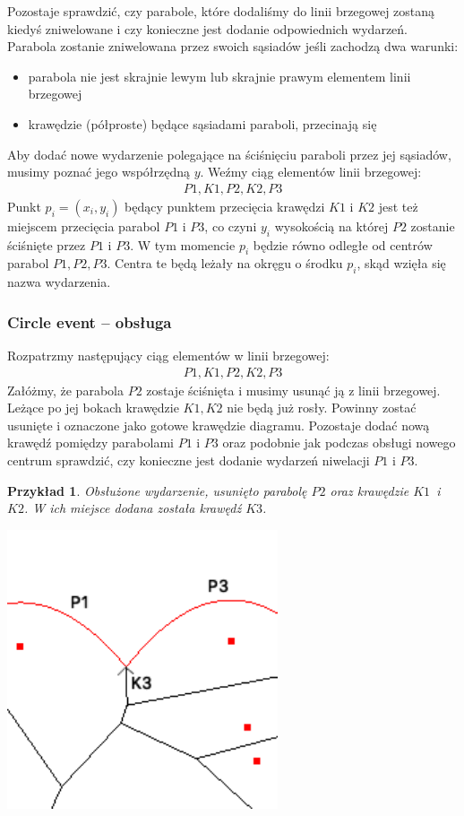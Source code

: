 \documentclass[declaration,shortabstract, inz]{iithesis}
\theoremstyle{definition} \newtheorem{definition}{Definicja}[]
\theoremstyle{plain} \newtheorem{remark}[definition]{Obserwacja}
\theoremstyle{plain} \newtheorem{theorem}[definition]{Twierdzenie}
\theoremstyle{plain} \newtheorem{example}{Przykład}[definition]
\theoremstyle{plain} \newtheorem{lemma}[definition]{Lemat}
\begin{document}
Pozostaje sprawdzić, czy parabole, które dodaliśmy do linii brzegowej zostaną kiedyś zniwelowane i czy konieczne jest dodanie odpowiednich wydarzeń. 
Parabola zostanie zniwelowana przez swoich sąsiadów jeśli zachodzą dwa warunki:
\begin{itemize}
	\item parabola nie jest skrajnie lewym lub skrajnie prawym elementem linii brzegowej
	\item krawędzie (półproste) będące sąsiadami paraboli, przecinają się
\end{itemize}
Aby dodać nowe wydarzenie polegające na ściśnięciu paraboli przez jej sąsiadów, musimy poznać jego współrzędną $y$. 
Weźmy ciąg elementów linii brzegowej:
\begin{align}
	P1, K1, P2, K2, P3
\end{align}
Punkt $p_i = (x_i, y_i)$ będący punktem przecięcia krawędzi $K1$ i $K2$ jest też miejscem przecięcia parabol $P1$ i $P3$, co czyni $y_i$
wysokością na której $P2$ zostanie ściśnięte przez $P1$ i $P3$. W tym momencie $p_i$ będzie równo odległe od centrów parabol $P1, P2, P3$. Centra te będą leżały na okręgu o środku $p_i$, skąd wzięła się nazwa wydarzenia.


\subsubsection{Circle event -- obsługa}
\label{sec:circle}
Rozpatrzmy następujący ciąg elementów w linii brzegowej:
\begin{align}
	P1, K1, P2, K2, P3
\end{align}
Załóżmy, że parabola $P2$ zostaje ściśnięta i musimy usunąć ją z linii brzegowej. Leżące po jej bokach krawędzie $K1, K2$ nie będą już rosły. Powinny zostać usunięte i oznaczone jako gotowe krawędzie diagramu. Pozostaje dodać nową krawędź pomiędzy parabolami $P1$ i $P3$ oraz podobnie jak podczas obsługi nowego centrum sprawdzić, czy konieczne jest dodanie wydarzeń niwelacji $P1$ i $P3$.


 \begin{example}
	Obsłużone wydarzenie, usunięto parabolę $P2$ oraz krawędzie $K1$~i~$K2$. W ich miejsce dodana została krawędź $K3$.
	
	\begin{center}
		\includegraphics[width=0.6\textwidth]{ExampleCircleEvent}
	\end{center}
\end{example}
\end{document}
